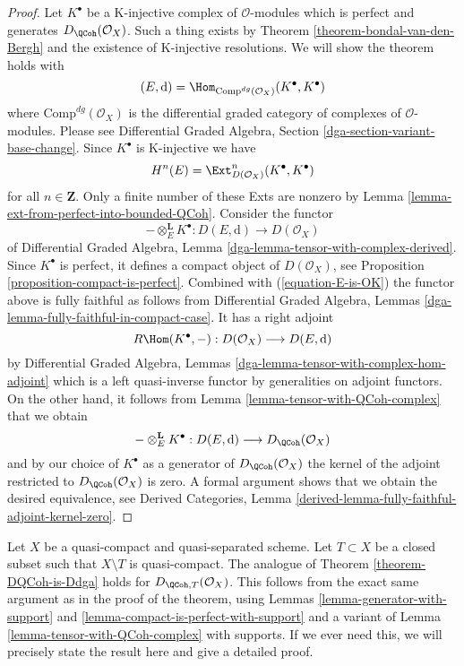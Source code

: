 \begin{proof}
Let $K^\bullet$ be a K-injective complex of $\mathcal{O}$-modules which
is perfect and generates $D_\QCoh(\mathcal{O}_X)$. Such a
thing exists by Theorem \ref{theorem-bondal-van-den-Bergh}
and the existence of K-injective resolutions. We will show the
theorem holds with
$$
(E, \text{d}) = \Hom_{\text{Comp}^{dg}(\mathcal{O}_X)}(K^\bullet, K^\bullet)
$$
where $\text{Comp}^{dg}(\mathcal{O}_X)$ is the differential graded category
of complexes of $\mathcal{O}$-modules. Please see
Differential Graded Algebra, Section \ref{dga-section-variant-base-change}.
Since $K^\bullet$ is K-injective we
have
\begin{equation}
\label{equation-E-is-OK}
H^n(E) = \Ext^n_{D(\mathcal{O}_X)}(K^\bullet, K^\bullet)
\end{equation}
for all $n \in \mathbf{Z}$. Only a finite number of these Exts
are nonzero by Lemma \ref{lemma-ext-from-perfect-into-bounded-QCoh}.
Consider the functor
$$
- \otimes_E^\mathbf{L} K^\bullet :
D(E, \text{d}) \longrightarrow D(\mathcal{O}_X)
$$
of
Differential Graded Algebra, Lemma
\ref{dga-lemma-tensor-with-complex-derived}.
Since $K^\bullet$ is perfect, it defines a compact object of
$D(\mathcal{O}_X)$, see Proposition \ref{proposition-compact-is-perfect}.
Combined with (\ref{equation-E-is-OK}) the functor above is fully
faithful as follows from
Differential Graded Algebra, Lemmas
\ref{dga-lemma-fully-faithful-in-compact-case}. It has a right adjoint
$$
R\Hom(K^\bullet, - ) : D(\mathcal{O}_X) \longrightarrow D(E, \text{d})
$$
by Differential Graded Algebra, Lemmas
\ref{dga-lemma-tensor-with-complex-hom-adjoint}
which is a left quasi-inverse functor by generalities on adjoint
functors. On the other hand, it follows from
Lemma \ref{lemma-tensor-with-QCoh-complex} that we obtain
$$
- \otimes_E^\mathbf{L} K^\bullet :
D(E, \text{d}) \longrightarrow D_\QCoh(\mathcal{O}_X)
$$
and by our choice of $K^\bullet$ as a generator of
$D_\QCoh(\mathcal{O}_X)$ the kernel of the adjoint
restricted to $D_\QCoh(\mathcal{O}_X)$ is zero.
A formal argument shows that we obtain the desired equivalence, see
Derived Categories, Lemma
\ref{derived-lemma-fully-faithful-adjoint-kernel-zero}.
\end{proof}

\begin{remark}
\label{remark-DQCoh-is-Ddga-with-support}
Let $X$ be a quasi-compact and quasi-separated scheme. Let $T \subset X$
be a closed subset such that $X \setminus T$ is quasi-compact.
The analogue of Theorem \ref{theorem-DQCoh-is-Ddga} holds
for $D_{\QCoh, T}(\mathcal{O}_X)$.
This follows from the exact same argument as in the proof
of the theorem, using
Lemmas \ref{lemma-generator-with-support} and
\ref{lemma-compact-is-perfect-with-support}
and a variant of Lemma \ref{lemma-tensor-with-QCoh-complex}
with supports.
If we ever need this, we will precisely state the
result here and give a detailed proof.
\end{remark}

